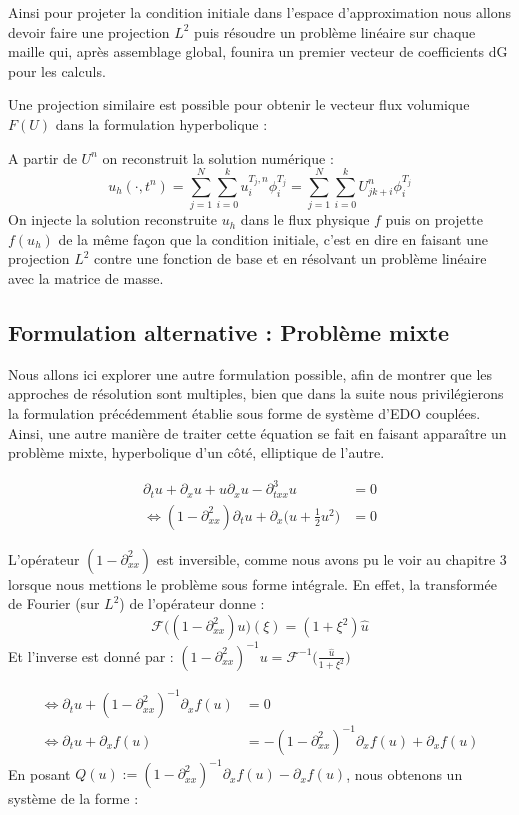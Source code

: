 Ainsi pour projeter la condition initiale dans l'espace d'approximation nous allons devoir faire une projection $L^2$ puis résoudre un problème linéaire
sur chaque maille qui, après assemblage global, founira un premier vecteur de coefficients dG pour les calculs.

Une projection similaire est possible pour obtenir le vecteur flux volumique $F(U)$ dans la formulation hyperbolique :

A partir de $U^n$ on reconstruit la solution numérique : 
$$u_h(\cdot,t^n) = \sum_{j=1}^{N}\sum_{i=0}^{k} u_i^{T_j,n} \phi_i^{T_j} = \sum_{j=1}^{N}\sum_{i=0}^{k} U_{jk + i}^n \phi_i^{T_j}$$ 
On injecte la solution reconstruite $u_h$ dans le flux physique $f$ puis on projette $f(u_h)$ de la même façon que la condition initiale, c'est en dire en faisant une 
projection $L^2$ contre une fonction de base et en résolvant un problème linéaire avec la matrice de masse.


\subsection{Formulation alternative : Problème mixte}

Nous allons ici explorer une autre formulation possible, afin de montrer que les approches de résolution sont multiples, bien que dans la suite nous privilégierons la formulation précédemment établie sous forme de système d'EDO couplées.
Ainsi, une autre manière de traiter cette équation se fait en faisant apparaître un problème mixte, hyperbolique d'un côté, elliptique de l'autre.


\begin{equation*}
\begin{split}
    \partial_t u + \partial_x u + u\partial_x u - \partial_{txx}^3u &= 0 \\
   \Leftrightarrow (1 - \partial_{xx}^2)\partial_t u + \partial_x \Big( u + \frac{1}{2}u^2 \Big) &= 0 
\end{split}
\end{equation*}

L'opérateur $(1 - \partial_{xx}^2)$ est inversible, comme nous avons pu le voir au chapitre 3 lorsque nous mettions le problème sous forme intégrale.
En effet, la transformée de Fourier (sur $L^2$) de l'opérateur donne :
$$ \mathcal{F}\Big((1-\partial_{xx}^2)u\Big)(\xi) = (1 + \xi^2)\hat{u} $$
Et l'inverse est donné par : $(1 - \partial_{xx}^2)^{-1}u = \mathcal{F}^{-1}\Big(\frac{\hat{u}}{1 + \xi^2}\Big) $

\begin{equation*}
\begin{split}
    \Leftrightarrow \partial_t u + (1 - \partial_{xx}^2)^{-1}\partial_xf(u) &= 0 \\
   \Leftrightarrow \partial_t u + \partial_x f(u) &= - (1 - \partial_{xx}^2)^{-1} \partial_x f(u) + \partial_x f(u) 
\end{split}
\end{equation*}
En posant $Q(u) := (1 - \partial_{xx}^2)^{-1}\partial_x f(u) - \partial_x f(u)$, nous obtenons un système de la forme :

